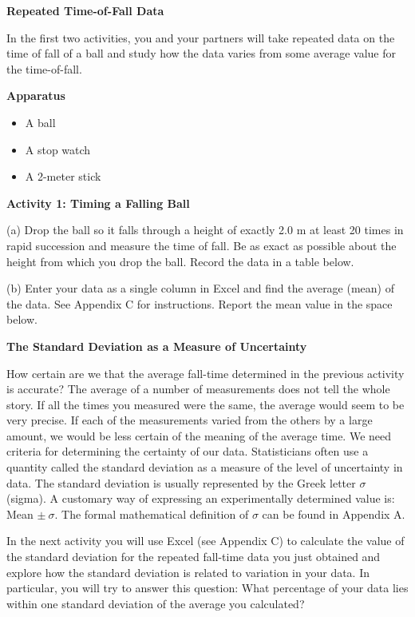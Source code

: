 \textbf{Repeated Time-of-Fall Data} 

In the first two activities, you and your partners will take repeated data on
the time of fall of a ball and study how the data varies from some average value
for the time-of-fall.

\textbf{Apparatus} 

\begin{itemize}
\item A ball 
\item A stop watch 
\item A 2-meter stick
\end{itemize}
\textbf{Activity 1: Timing a Falling Ball} 

(a) Drop the ball so it falls through a height of exactly 2.0 m at least 20
times in rapid succession and measure the time of fall. Be as exact as possible
about the height from which you drop the ball. Record the data in a table below.
\vspace{50mm}

(b) Enter your data as a single column in Excel and find the 
average (mean) of the data.
See Appendix C for instructions. Report the
mean value in the space below.
\vspace{10mm}

\textbf{The Standard Deviation as a Measure of Uncertainty }

How certain are we that the average fall-time determined in the previous activity
is accurate? The average of a number of measurements does not tell the whole
story. If all the times you measured were the same, the average would seem to
be very precise. If each of the measurements varied from the others by a large
amount, we would be less certain of the meaning of the average time. We need
criteria for determining the certainty of our data. Statisticians often use
a quantity called the standard deviation as a measure of the level of uncertainty
in data. The standard deviation is usually represented by the Greek letter \( \sigma  \)
(sigma). A customary way of expressing an experimentally determined value is:
Mean  \( \pm \ \sigma  \). The formal mathematical definition of \( \sigma  \)
can be found in Appendix A.

In the next activity you will use Excel (see Appendix C) to calculate
the value of the standard deviation for the repeated fall-time data you just
obtained and explore how the standard deviation is related to variation in your
data. In particular, you will try to answer this question: What percentage of
your data lies within one standard deviation of the average you calculated?

